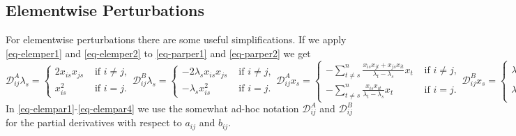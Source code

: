 \documentclass[
  12pt,
  letterpaper,
  DIV=11,
  numbers=noendperiod]{scrartcl}
\begin{document}
\subsection{Elementwise Perturbations}\label{sec-parelementwise}

For elementwise perturbations there are some useful simplifications. If
we apply \eqref{eq-elemper1} and \eqref{eq-elemper2} to
\eqref{eq-parper1} and \eqref{eq-parper2} we get \begin{subequations}
\begin{equation}
\mathcal{D}_{ij}^A\lambda_s=\begin{cases}2x_{is}x_{js}&\text{ if }i\not= j,\\
x_{is}^2&\text{ if }i=j.
\end{cases}\label{eq-elempar1}
\end{equation}
\begin{equation}
\mathcal{D}_{ij}^B\lambda_s=\begin{cases}-2\lambda_sx_{is}x_{js}&\text{ if }i\not= j,\\
-\lambda_sx_{is}^2&\text{ if }i=j.
\end{cases}
\end{equation}\label{eq-elempar2}
\begin{equation}
\mathcal{D}_{ij}^Ax_s=
\begin{cases}
-\sum_{t\not= s}^n\frac{x_{is}x_{jt}+x_{js}x_{it}}{\lambda_t-\lambda_s}x_t&\text{ if }i\not= j,\\
-\sum_{t\not= s}^n\frac{x_{is}x_{it}}{\lambda_t-\lambda_s}x_t&\text{ if }i=j.
\end{cases}\label{eq-elempar3}
\end{equation}
\begin{equation}
\mathcal{D}_{ij}^Bx_s=
\begin{cases}
\lambda_s\sum_{t\not= s}^n\frac{x_{is}x_{jt}+x_{js}x_{it}}{\lambda_t-\lambda_s}x_t-x_{is}x_{js}x_s&\text{ if }i\not= j,\\
\lambda_s\sum_{t\not= s}^n\frac{x_{is}x_{it}}{\lambda_t-\lambda_s}x_t-\frac12x_{is}^2x_s&\text{ if }i=j.
\end{cases}\label{eq-elempar4}
\end{equation}
\end{subequations} In \eqref{eq-elempar1}-\eqref{eq-elempar4} we use the
somewhat ad-hoc notation \(\mathcal{D}_{ij}^A\) and
\(\mathcal{D}_{ij}^B\) for the partial derivatives with respect to
\(a_{ij}\) and \(b_{ij}\).
\end{document}
